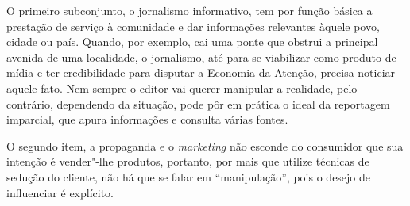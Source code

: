 O primeiro subconjunto, o jornalismo informativo, tem por função básica
a prestação de serviço à comunidade e dar informações relevantes àquele
povo, cidade ou país. Quando, por exemplo, cai uma ponte que obstrui a
principal avenida de uma localidade, o jornalismo, até para se
viabilizar como produto de mídia e ter credibilidade para disputar a
Economia da Atenção, precisa noticiar aquele fato. Nem sempre o editor
vai querer manipular a realidade, pelo contrário, dependendo da
situação, pode pôr em prática o ideal da reportagem imparcial, que apura
informações e consulta várias fontes.

O segundo item, a propaganda e o \emph{marketing} não esconde do
consumidor que sua intenção é vender"-lhe produtos, portanto, por mais
que utilize técnicas de sedução do cliente, não há que se falar em
``manipulação'', pois o desejo de influenciar é explícito.

